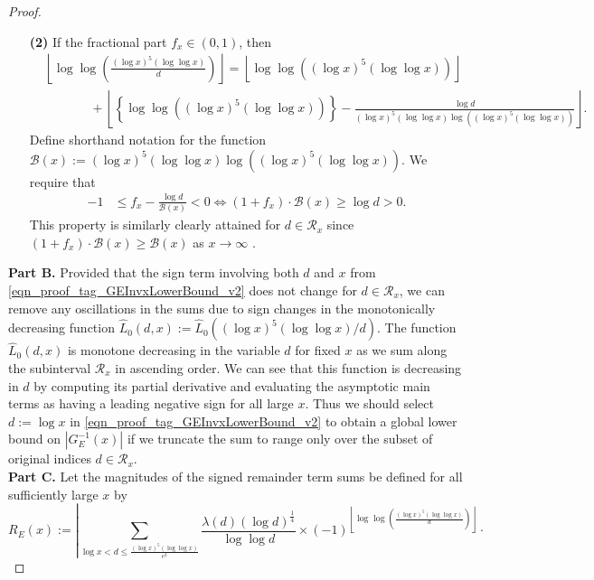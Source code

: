 \documentclass[11pt,reqno,a4letter]{article}
\numberwithin{figure}{section}
\numberwithin{table}{section}
\newcommand{\floor}[1]{\left\lfloor #1 \right\rfloor}
\theoremstyle{plain}
\numberwithin{theorem}{section}
\theoremstyle{definition}
\begin{document}
\begin{proof}
\begin{itemize}[itemsep=0pt,topsep=0pt,leftmargin=0.35in]
\item[\textbf{(2)}] If the fractional part $f_x \in (0, 1)$, then 
     \begin{align*} 
     & \floor{\log\log\left(\frac{(\log x)^{5} (\log\log x)}{d}\right)} = 
          \floor{\log\log\left((\log x)^{5} (\log\log x)\right)} \\ 
          & \phantom{\qquad =\ } + 
          \floor{\left\{\log\log\left((\log x)^{5} (\log\log x)\right)\right\} - 
          \frac{\log d}{(\log x)^{5} (\log\log x) \log\left( 
          (\log x)^{5} (\log\log x)\right)}}. 
     \end{align*} 
     Define shorthand notation for the function 
     $\mathcal{B}(x) := (\log x)^{5} (\log\log x) \log\left((\log x)^{5} (\log\log x)\right)$. 
     We require that 
     \begin{align*} 
     -1 & \leq f_x - \frac{\log d}{\mathcal{B}(x)} < 0 \iff 
          (1 + f_x) \cdot \mathcal{B}(x) \geq \log d > 0. 
     \end{align*} 
     This property is similarly clearly attained for $d \in \mathcal{R}_x$ 
     since $(1 + f_x) \cdot \mathcal{B}(x) \geq \mathcal{B}(x)$ 
     as $x \rightarrow \infty$ . 
\end{itemize} 
\textbf{Part B.} 
Provided that the sign term involving both $d$ and $x$ 
from \eqref{eqn_proof_tag_GEInvxLowerBound_v2} does not change for 
$d \in \mathcal{R}_x$, 
we can remove any oscillations in the sums due to sign changes in the monotonically 
decreasing function 
$\widehat{L}_0(d, x) := \widehat{L}_0\left((\log x)^{5} (\log\log x)/d\right)$. 
The function $\widehat{L}_0(d, x)$ is monotone decreasing 
in the variable $d$ for fixed $x$ as we sum along the 
subinterval $\mathcal{R}_x$ in ascending order. 
We can see that this function is decreasing 
in $d$ by computing its partial derivative and 
evaluating the asymptotic main terms as having a leading negative sign 
for all large $x$. 
Thus we should select $d := \log x$ in 
\eqref{eqn_proof_tag_GEInvxLowerBound_v2} to 
obtain a global lower bound on $|G_E^{-1}(x)|$ if we truncate the sum 
to range only over the subset of original indices $d \in \mathcal{R}_x$. \\ 
\textbf{Part C.} 
Let the magnitudes of the signed remainder term sums be 
defined for all sufficiently large $x$ by 
\[
R_E(x) := \left\lvert \sum_{\log x < d \leq \frac{(\log x)^{5} (\log\log x)}{e^2}} 
     \frac{\lambda(d) (\log d)^{\frac{1}{4}}}{\log\log d} \times 
     (-1)^{\floor{\log\log\left(\frac{(\log x)^{5} (\log\log x)}{d}\right)}} \cdot 
\]
\end{proof}
\end{document}
